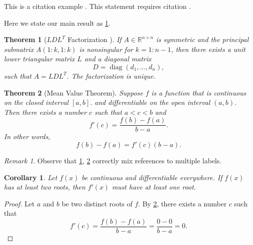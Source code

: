 \documentclass[10pt,reqno,final]{article}
\theoremstyle{plain}
\newtheorem{theorem}{Theorem}[section]
\newtheorem{corollary}{Corollary}[section]
\theoremstyle{definition}
\theoremstyle{remark}
\newtheorem{remark}{Remark}[section]
\numberwithin{equation}{section}
\numberwithin{figure}{section}
\numberwithin{table}{section}
\begin{document}
This is a citation example \cite{Adams2003}. This statement requires citation \cite{Shen1994,Tadmor2012,TreWei2014}.

Here we state our main result as \ref{thm:bigthm}.

\begin{theorem}[$LDL^T$ Factorization \cite{GoVa2013}]\label{thm:bigthm}
  If $A \in \mathbb{R}^{n \times n}$ is symmetric and the principal
  submatrix $A(1:k,1:k)$ is nonsingular for $k=1:n-1$, then there
  exists a unit lower triangular matrix $L$ and a diagonal matrix
  \begin{equation*}
    D = \operatorname{diag}(d_1,\dots,d_n),  %
  \end{equation*}
  such that $A=LDL^T$. The factorization is unique.
\end{theorem}


\begin{theorem}[Mean Value Theorem]\label{thm:mvt}
  Suppose $f$ is a function that is continuous on the closed interval
  $[a,b]$.  and differentiable on the open interval $(a,b)$.
  Then there exists a number $c$ such that $a < c < b$ and
  \begin{equation*}
    f'(c) = \frac{f(b)-f(a)}{b-a}.
  \end{equation*}
  In other words,
  \begin{equation*}
    f(b)-f(a) = f'(c)(b-a).
  \end{equation*}
\end{theorem}

\begin{remark}
Observe that \ref{thm:bigthm}, \ref{thm:mvt} correctly mix references
to multiple labels.
\end{remark}


\begin{corollary}\label{cor:a}
  Let $f(x)$ be continuous and differentiable everywhere. If $f(x)$
  has at least two roots, then $f'(x)$ must have at least one root.
\end{corollary}
\begin{proof}
  Let $a$ and $b$ be two distinct roots of $f$.
  By \ref{thm:mvt}, there exists a number $c$ such that
  \begin{equation*}
    f'(c) = \frac{f(b)-f(a)}{b-a} = \frac{0-0}{b-a} = 0.
  \end{equation*}
\end{proof}
\end{document}
